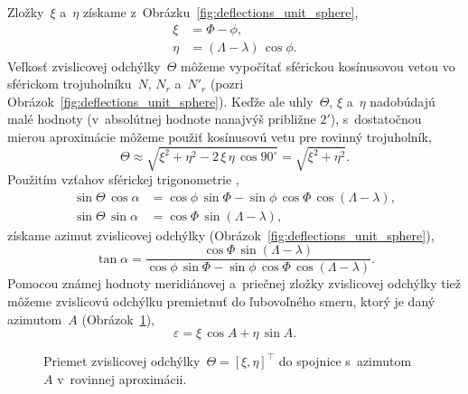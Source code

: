 \documentclass[a4paper, 12pt]{book}
\begin{document}
Zložky~$\xi$ a~$\eta$ získame z~Obrázku~\ref{fig:deflections_unit_sphere},
%
\begin{equation}
\begin{split}
\xi  &= \Phi - \phi{,}\\
\eta &= (\Lambda - \lambda) \, \cos\phi{.}
\end{split}
\end{equation}
%
Veľkosť zvislicovej odchýlky~$\Theta$ môžeme vypočítať sférickou kosínusovou 
vetou vo sférickom trojuholníku~$N$, $N_r$ a~$N'_r$ (pozri 
Obrázok~\ref{fig:deflections_unit_sphere}).  Keďže ale uhly~$\Theta$, $\xi$ 
a~$\eta$ nadobúdajú malé hodnoty (v~absolútnej hodnote nanajvýš približne 
$2'$), s~dostatočnou mierou aproximácie môžeme použiť kosínusovú vetu pre 
rovinný trojuholník,
%
\begin{equation}
\label{eq:deflection_total}
\Theta \approx \sqrt{\xi^2 + \eta^2 - 2\, \xi \, \eta \, \cos 90^{\circ}} 
= \sqrt{\xi^2 + \eta^2}{.}
\end{equation}
%
Použitím vzťahov sférickej trigonometrie 
\parencite[napríklad][]{MoritzPhysicalGeodesy},
%
\begin{equation}
\label{eq:deflection_aux}
\begin{split}
\sin\Theta \, \cos\alpha &= \cos\phi \, \sin\Phi - \sin\phi \, \cos\Phi \, 
\cos(\Lambda - \lambda){,}\\
\sin\Theta \, \sin\alpha &= \cos\Phi \, \sin(\Lambda - \lambda),
\end{split}
\end{equation}
%
získame azimut zvislicovej odchýlky 
(Obrázok~\ref{fig:deflections_unit_sphere}),
%
\begin{equation}
\tan\alpha = \frac{\cos\Phi \, \sin(\Lambda - \lambda)}{\cos\phi \, \sin\Phi 
- \sin\phi \, \cos\Phi \, \cos(\Lambda - \lambda)}{.}
\end{equation}
%
Pomocou známej hodnoty meridiánovej a~priečnej zložky zvislicovej odchýlky tiež 
môžeme zvislicovú odchýlku premietnuť do ľubovoľného smeru, ktorý je daný 
azimutom~$A$ (Obrázok~\ref{fig:deflections_projection}),
%
\begin{equation}
\label{eq:deflection_vareps}
\varepsilon = \xi \, \cos A + \eta \, \sin A{.}
\end{equation}

\begin{figure}[bt]
\centering

\caption{Priemet zvislicovej odchýlky~$\Theta = [\xi, \eta]^\top$ do spojnice 
s~azimutom~$A$ v~rovinnej aproximácii.}
\label{fig:deflections_projection}
\end{figure}
\end{document}

